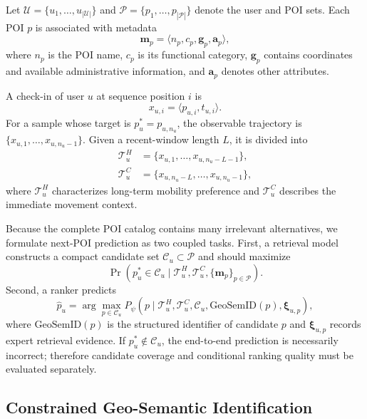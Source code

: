 \documentclass[journal]{IEEEtran}
\newcommand{\gsid}{\mathrm{GeoSemID}}
\newcommand{\POIs}{\mathcal{P}}
\newcommand{\Users}{\mathcal{U}}
\begin{document}
Let $\Users=\{u_1,\ldots,u_{|\Users|}\}$ and
$\POIs=\{p_1,\ldots,p_{|\POIs|}\}$ denote the user and POI sets.
Each POI $p$ is associated with metadata
\begin{equation}
\bm{m}_{p}
=
\langle n_p,c_p,\bm{g}_p,\bm{a}_p\rangle,
\label{eq:poi_metadata}
\end{equation}
where $n_p$ is the POI name, $c_p$ is its functional category,
$\bm{g}_p$ contains coordinates and available administrative information,
and $\bm{a}_p$ denotes other attributes.

A check-in of user $u$ at sequence position $i$ is
\begin{equation}
x_{u,i}=\langle p_{u,i},t_{u,i}\rangle.
\label{eq:checkin}
\end{equation}
For a sample whose target is $p_u^{*}=p_{u,n_u}$, the observable trajectory is
$\{x_{u,1},\ldots,x_{u,n_u-1}\}$.
Given a recent-window length $L$, it is divided into
\begin{align}
\mathcal{T}_{u}^{H}
&=
\{x_{u,1},\ldots,x_{u,n_u-L-1}\},
\label{eq:historical_trajectory}\\
\mathcal{T}_{u}^{C}
&=
\{x_{u,n_u-L},\ldots,x_{u,n_u-1}\},
\label{eq:current_trajectory}
\end{align}
where $\mathcal{T}_{u}^{H}$ characterizes long-term mobility preference and
$\mathcal{T}_{u}^{C}$ describes the immediate movement context.

Because the complete POI catalog contains many irrelevant alternatives, we
formulate next-POI prediction as two coupled tasks.
First, a retrieval model constructs a compact candidate set
$\mathcal{C}_u\subset\POIs$ and should maximize
\begin{equation}
\Pr(p_u^{*}\in\mathcal{C}_u
\mid
\mathcal{T}_{u}^{H},\mathcal{T}_{u}^{C},\{\bm{m}_p\}_{p\in\POIs}).
\label{eq:coverage_objective}
\end{equation}
Second, a ranker predicts
\begin{equation}
\widehat{p}_{u}
=
\arg\max_{p\in\mathcal{C}_u}
P_{\psi}
\left(
p\mid
\mathcal{T}_{u}^{H},
\mathcal{T}_{u}^{C},
\mathcal{C}_u,
\gsid(p),
\bm{\xi}_{u,p}
\right),
\label{eq:final_prediction}
\end{equation}
where $\gsid(p)$ is the structured identifier of candidate $p$ and
$\bm{\xi}_{u,p}$ records expert retrieval evidence.
If $p_u^{*}\notin\mathcal{C}_u$, the end-to-end prediction is necessarily
incorrect; therefore candidate coverage and conditional ranking quality must
be evaluated separately.

\subsection{Constrained Geo-Semantic Identification}
\end{document}
